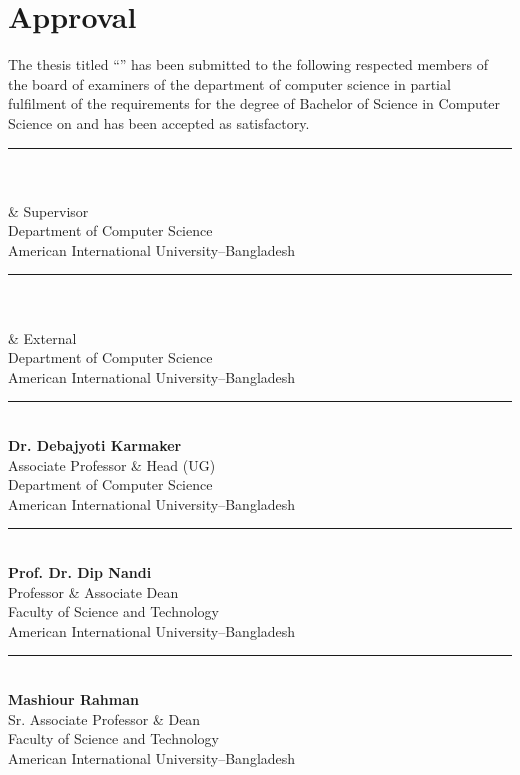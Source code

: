 \chapter*{Approval}

The thesis titled ``\thesistitle'' has been submitted to the following
respected members of the board of examiners of the department of computer
science in partial fulfilment of the requirements for the degree of Bachelor of
Science in Computer Science on  and has been accepted as
satisfactory.

\vspace{1.6cm}

\noindent
\begin{minipage}[t]{0.48\textwidth}
\rule{6cm}{0.4pt}\\
\textbf{\supervisorname}\\
 \& Supervisor\\
Department of Computer Science\\
American International University--Bangladesh
\end{minipage}%
\hfill
\begin{minipage}[t]{0.48\textwidth}
\rule{6cm}{0.4pt}\\
\textbf{}\\
 \& External\\
Department of Computer Science\\
American International University--Bangladesh
\end{minipage}

\vspace{1.8cm}

\noindent
\begin{minipage}[t]{0.48\textwidth}
\rule{6cm}{0.4pt}\\
\textbf{Dr. Debajyoti Karmaker}\\
Associate Professor \& Head (UG)\\
Department of Computer Science\\
American International University--Bangladesh
\end{minipage}%
\hfill
\begin{minipage}[t]{0.48\textwidth}
\rule{6cm}{0.4pt}\\
\textbf{Prof. Dr. Dip Nandi}\\
Professor \& Associate Dean\\
Faculty of Science and Technology\\
American International University--Bangladesh
\end{minipage}

\vspace{1.8cm}

\noindent
\begin{minipage}[t]{0.48\textwidth}
\rule{6cm}{0.4pt}\\
\textbf{Mashiour Rahman}\\
Sr. Associate Professor \& Dean\\
Faculty of Science and Technology\\
American International University--Bangladesh
\end{minipage}

\clearpage
